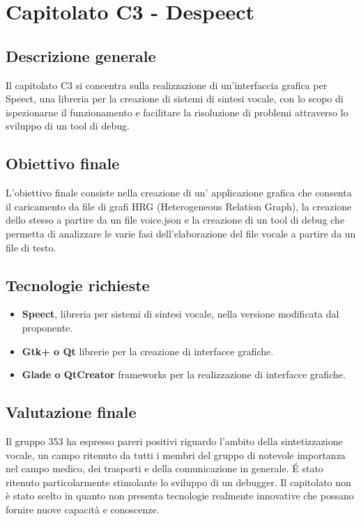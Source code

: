 \documentclass[StudioDiFattibilità.tex]{subfiles}
\begin{document}
\chapter{Capitolato C3 - Despeect}
\section{Descrizione generale}
Il capitolato C3 si concentra sulla realizzazione di un'interfaccia grafica per Speect, una libreria per la creazione di sistemi di sintesi vocale, con lo scopo di ispezionarne il funzionamento e facilitare la risoluzione di problemi attraverso lo sviluppo di un tool di debug. 
\section{Obiettivo finale}
L'obiettivo finale consiste nella creazione di un’ applicazione grafica che consenta il caricamento da file di grafi HRG (Heterogeneous Relation Graph), la creazione dello stesso a partire da un file voice.json e la creazione di un tool di debug che permetta di analizzare le varie fasi dell'elaborazione del file vocale a partire da un file di testo.
\section{Tecnologie richieste}
\begin{itemize}
	\item \textbf{Speect}, libreria per sistemi di sintesi vocale, nella versione modificata dal proponente.
	\item \textbf{Gtk+ o Qt} librerie per la creazione di interfacce grafiche.
	\item \textbf{Glade o QtCreator} frameworks per la realizzazione di interfacce grafiche.
\end{itemize}
\section{Valutazione finale}
Il gruppo 353 ha espresso pareri positivi riguardo l'ambito della sintetizzazione vocale, un campo ritenuto da tutti i membri del gruppo di notevole importanza nel campo medico, dei trasporti e della comunicazione in generale.
\'{E} stato ritenuto particolarmente stimolante lo sviluppo di un debugger.
Il capitolato non è stato scelto in quanto non presenta tecnologie realmente innovative che possano fornire nuove capacità e conoscenze.
\end{document}
